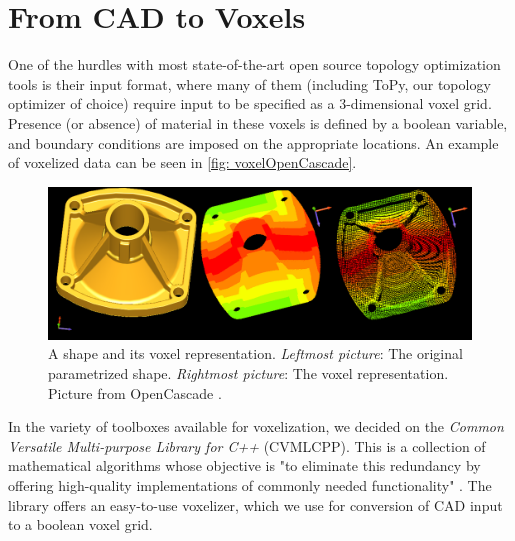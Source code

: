 \section{From CAD to Voxels}
\label{sec: CADToVoxels}
One of the hurdles with most state-of-the-art open source topology optimization tools is their input format, where many of them (including ToPy, our topology optimizer of choice) require input to be specified as a 3-dimensional voxel grid. Presence (or absence) of material in these voxels is defined by a boolean variable, and boundary conditions are imposed on the appropriate locations. An example of voxelized data can be seen in \autoref{fig: voxelOpenCascade}. %
\begin{figure}
\centering
  \includegraphics[scale=0.3]{Pictures/CADToVoxel/voxels_wp_image005.png}
\caption{A shape and its voxel representation. \emph{Leftmost picture}: The original parametrized shape. \emph{Rightmost picture}: The voxel representation. Picture from OpenCascade \cite{OpenCascade}.}
\label{fig: voxelOpenCascade}
\end{figure}

\label{sec:CVMLCPP}
In the variety of toolboxes available for voxelization, we decided on the \emph{Common Versatile Multi-purpose Library for C++} (CVMLCPP). This is a collection of mathematical algorithms whose objective is "to eliminate this redundancy by offering high-quality implementations of commonly needed functionality" \cite{CVMLCPP}. The library offers an easy-to-use voxelizer, which we use for conversion of CAD input to a boolean voxel grid.

